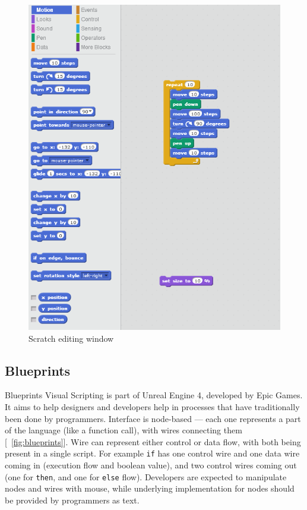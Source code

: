 \documentclass[11pt]{scrartcl}
\newcommand*{\figref}[1]{[\textbf{\figurename}~\ref{#1}]}
\begin{document}
\begin{figure}[hbt]
  \centering
  \includegraphics[scale=0.3]{img/s-puzzle}
  \caption{Scratch editing window}
\label{fig:scratch}
\end{figure}

\subsection{Blueprints}
Blueprints Visual Scripting is part of Unreal Engine 4, developed by Epic Games.
It aims to help designers and developers help in processes that have
traditionally been done by programmers.
Interface is node-based --- each one represents a part of the language (like a
function call), with wires connecting them \figref{fig:blueprints}.
Wire can represent either control or data flow, with both being present in a
single script.
For example \lstinline|if| has one control wire and one data wire coming in (execution
flow and boolean value), and two control wires coming out (one for \lstinline|then|, and
one for \lstinline|else| flow).
Developers are expected to manipulate nodes and wires with mouse, while
underlying implementation for nodes should be provided by programmers as text.
\end{document}
